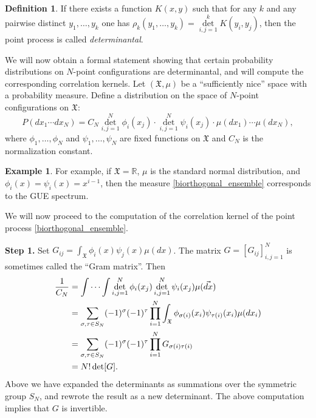 \documentclass[letterpaper,11pt,oneside,reqno]{amsart}
\numberwithin{equation}{section}
\newcommand{\Det}{\mathop{\mathrm{det}}\limits}
\theoremstyle{definition}
\newtheorem{definition}[proposition]{Definition}
\newtheorem{example}[proposition]{Example}
\begin{document}
\begin{definition}\label{def:}
  If there exists a function $K(x,y)$ such that 
  for any $k$ and any pairwise distinct $y_1,\ldots,y_k$ one has
  $\rho_k(y_1,\ldots,y_k)=\Det_{i,j=1}^{k}K(y_i,y_j)$,
  then the point process is called \emph{determinantal}.
\end{definition}

We will now obtain a formal statement showing that certain probability distributions
on $N$-point configurations are determinantal, and will compute the corresponding
correlation kernels. 
Let $(\mathfrak{X},\mu)$ be a ``sufficiently nice'' space with a probability measure.
Define a distribution on the space of $N$-point configurations on $\mathfrak{X}$:
\begin{equation}\label{biorthogonal_ensemble}
  P(dx_1\cdots dx_N)=C_N \Det_{i,j=1}^{N}\phi_i(x_j)\cdot \Det_{i,j=1}^{N}\psi_i(x_j)\cdot \mu(dx_1)\cdots\mu(dx_N),
\end{equation}
where $\phi_1,\ldots,\phi_N$ and $\psi_1,\ldots,\psi_N$ are fixed functions on $\mathfrak{X}$
and
$C_N$ is the normalization constant.
\begin{example}
	For example, if $\mathfrak{X}=\mathbb{R}$,
	$\mu$ is the standard normal distribution, and 
	$\phi_i(x)=\psi_i(x)=x^{i-1}$, 
	then the measure \eqref{biorthogonal_ensemble} corresponds to the GUE spectrum.
\end{example}

We will now proceed to the computation of the correlation kernel of the 
point process \eqref{biorthogonal_ensemble}.

\textbf{Step 1.}
Set $G_{ij}=\int_{\mathfrak{X}} \phi_i(x)\psi_j(x) \mu(dx)$. The matrix $G=[G_{ij}]_{i,j=1}^N$ is 
sometimes called the ``Gram matrix''. Then 
\begin{align*}
  \frac{1}{C_N} &= \idotsint \Det_{i,j=1}^{N}\phi_i(x_j) \Det_{i,j=1}^{N}\psi_i(x_j) \mu(\vec{dx}) \\
  &= \sum_{\sigma, \tau\in S_N} (-1)^{\sigma} (-1)^{\tau} \prod_{i=1}^N \int_{\mathfrak{X}} \phi_{\sigma(i)}(x_i) \psi_{\tau(i)}(x_i) \mu(dx_i) \\
  &= \sum_{\sigma, \tau\in S_N} (-1)^{\sigma} (-1)^{\tau} \prod_{i=1}^N G_{\sigma(i)\tau(i)} \\
  &= N! \det[G].
\end{align*}
Above we have expanded the determinants
as summations over the symmetric group $S_N$,
and rewrote the result as a new determinant.
The above computation implies that $G$ is invertible. 
\end{document}

